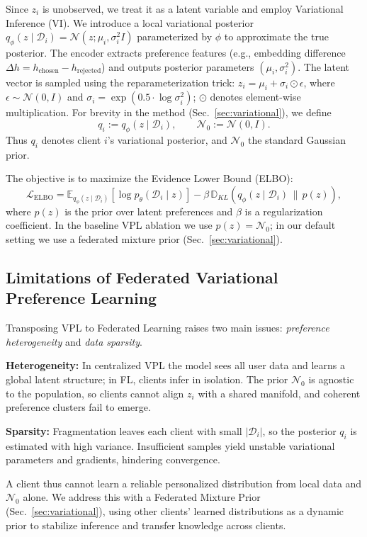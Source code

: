 Since $z_i$ is unobserved, we treat it as a latent variable and employ Variational Inference (VI). We introduce a local variational posterior $q_\phi(z \mid \mathcal{D}_i) = \mathcal{N}(z; \mu_i, \sigma_i^2 I)$ parameterized by $\phi$ to approximate the true posterior. The encoder extracts preference features (e.g., embedding difference $\Delta h = h_{\text{chosen}} - h_{\text{rejected}}$) and outputs posterior parameters $(\mu_i, \sigma_i^2)$. The latent vector is sampled using the reparameterization trick: $z_i = \mu_i + \sigma_i \odot \epsilon$, where $\epsilon \sim \mathcal{N}(0, I)$ and $\sigma_i = \exp(0.5 \cdot \log\sigma_i^2)$; $\odot$ denotes element-wise multiplication. For brevity in the method (Sec.~\ref{sec:variational}), we define
\begin{equation}
    q_i := q_\phi(z \mid \mathcal{D}_i), \qquad \mathcal{N}_0 := \mathcal{N}(0, I).
\end{equation}
Thus $q_i$ denotes client $i$'s variational posterior, and $\mathcal{N}_0$ the standard Gaussian prior.

The objective is to maximize the Evidence Lower Bound (ELBO):
\begin{equation} \label{eq:elbo-prelim}
    \mathcal{L}_{\text{ELBO}} = \mathbb{E}_{q_\phi(z \mid \mathcal{D}_i)} \left[ \log p_\theta(\mathcal{D}_i \mid z) \right] - \beta \,\mathbb{D}_{KL}(q_\phi(z \mid \mathcal{D}_i) \,\|\, p(z)),
\end{equation}
where $p(z)$ is the prior over latent preferences and $\beta$ is a regularization coefficient. In the baseline VPL ablation we use $p(z) = \mathcal{N}_0$; in our default setting we use a federated mixture prior (Sec.~\ref{sec:variational}).

\subsection{Limitations of Federated Variational Preference Learning}
\label{sec:prelim-limitations}
Transposing VPL to Federated Learning raises two main issues: \textit{preference heterogeneity} and \textit{data sparsity}.

\textbf{Heterogeneity:} In centralized VPL the model sees all user data and learns a global latent structure; in FL, clients infer in isolation. The prior $\mathcal{N}_0$ is agnostic to the population, so clients cannot align $z_i$ with a shared manifold, and coherent preference clusters fail to emerge.

\textbf{Sparsity:} Fragmentation leaves each client with small $|\mathcal{D}_i|$, so the posterior $q_i$ is estimated with high variance. Insufficient samples yield unstable variational parameters and gradients, hindering convergence.

A client thus cannot learn a reliable personalized distribution from local data and $\mathcal{N}_0$ alone. We address this with a Federated Mixture Prior (Sec.~\ref{sec:variational}), using other clients' learned distributions as a dynamic prior to stabilize inference and transfer knowledge across clients.
